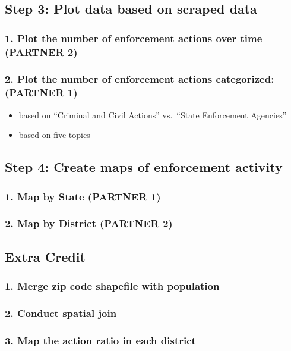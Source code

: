 \documentclass[
  letterpaper,
  DIV=11,
  numbers=noendperiod]{scrartcl}
\begin{document}
\subsection{Step 3: Plot data based on scraped
data}\label{step-3-plot-data-based-on-scraped-data}

\subsubsection{1. Plot the number of enforcement actions over time
(PARTNER
2)}\label{plot-the-number-of-enforcement-actions-over-time-partner-2}

\subsubsection{2. Plot the number of enforcement actions categorized:
(PARTNER
1)}\label{plot-the-number-of-enforcement-actions-categorized-partner-1}

\begin{itemize}
\item
  based on ``Criminal and Civil Actions'' vs.~``State Enforcement
  Agencies''
\item
  based on five topics
\end{itemize}

\subsection{Step 4: Create maps of enforcement
activity}\label{step-4-create-maps-of-enforcement-activity}

\subsubsection{1. Map by State (PARTNER
1)}\label{map-by-state-partner-1}

\subsubsection{2. Map by District (PARTNER
2)}\label{map-by-district-partner-2}

\subsection{Extra Credit}\label{extra-credit}

\subsubsection{1. Merge zip code shapefile with
population}\label{merge-zip-code-shapefile-with-population}

\subsubsection{2. Conduct spatial join}\label{conduct-spatial-join}

\subsubsection{3. Map the action ratio in each
district}\label{map-the-action-ratio-in-each-district}
\end{document}
